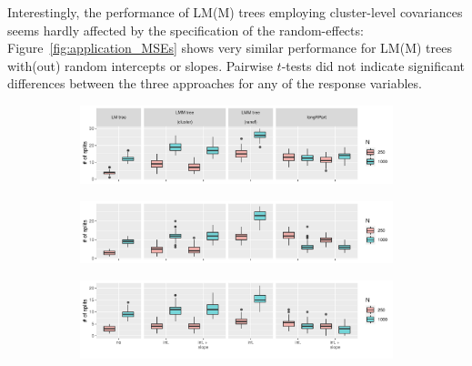 \documentclass[doc,floatsintext,natbib]{apa7}
\begin{document}
Interestingly, the performance of LM(M) trees employing cluster-level covariances seems hardly affected by the specification of the random-effects: Figure~\ref{fig:application_MSEs} shows very similar performance for LM(M) trees with(out) random intercepts or slopes. Pairwise $t$-tests did not indicate significant differences between the three approaches for any of the response variables.



\begin{figure}[!b]
\caption{Tree sizes for trees fitted to math (top), reading (middle) and science (bottom) ability trajectories.}
\begin{subfigure}{1.2\textwidth}
\includegraphics{_Partitioning_GCMs_with_GLMM_trees-028}
\end{subfigure}
\begin{subfigure}{1.2\textwidth}
\includegraphics{_Partitioning_GCMs_with_GLMM_trees-029}
\end{subfigure}
\begin{subfigure}{1.2\textwidth}
\includegraphics{_Partitioning_GCMs_with_GLMM_trees-030}
\end{subfigure}
\label{fig:application_sizes}
\end{figure}
\end{document}
